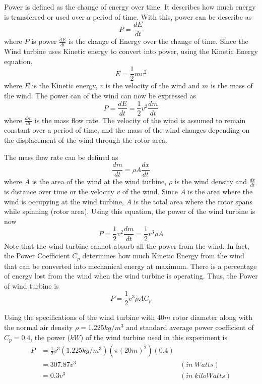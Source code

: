 
Power is defined as the change of energy over time. It describes how much energy is transferred or used over a period of time. With this, power can be describe as
\begin{equation}
    P = \frac{dE}{dt}
\end{equation}
where $P$ is power $\frac{dE}{dt}$ is the change of Energy over the change of time. Since the Wind turbine uses Kinetic energy to convert into power, using the Kinetic Energy equation,
\begin{equation}
    E = \frac{1}{2}mv^{2}
\end{equation}
where $E$ is the Kinetic energy, $v$ is the velocity of the wind and $m$ is the mass of the wind. The power can of the wind can now be expressed as
\begin{equation}
    P = \frac{dE}{dt} = \frac{1}{2}v^{2}\frac{dm}{dt}
\end{equation}
where $\frac{dm}{dt}$ is the mass flow rate. The velocity of the wind is assumed to remain constant over a period of time, and the mass of the wind changes depending on the displacement of the wind through the rotor area.

The mass flow rate can be defined as
\begin{equation}
    \frac{dm}{dt} = \rho A\frac{dx}{dt}
\end{equation}
where $A$ is the area of the wind at the wind turbine, $\rho$ is the wind density and $\frac{dx}{dt}$ is distance over time or the velocity $v$ of the wind. Since $A$ is the area where the wind is occupying at the wind turbine, $A$ is the total area where the rotor spans while spinning (rotor area). Using this equation, the power of the wind turbine is now
\begin{equation}
    P = \frac{1}{2}v^{2}\frac{dm}{dt} = \frac{1}{2}v^{3}\rho A
\end{equation}
Note that the wind turbine cannot absorb all the power from the wind. In fact, the Power Coefficient $C_p$ determines how much Kinetic Energy from the wind that can be converted into mechanical energy at maximum. There is a percentage of energy lost from the wind when the wind turbine is operating. Thus, the Power of wind turbine is
\begin{equation}
    P =  \frac{1}{2}v^{3}\rho A C_{p}
\end{equation}

Using the specifications of the wind turbine with $40m$ rotor diameter along with the normal air density $\rho = 1.225kg/m^{3}$ and standard average power coefficient of $C_{p}=0.4$, the power ($kW$) of the wind turbine used in this experiment is 
\begin{align*}
    P &=  \frac{1}{2}v^{3}(1.225kg/m^3)(\pi (20m)^2)(0.4)\\
        &= 307.87v^{3} &(in \;Watts) \\
        &= 0.3v^3 &(in \;kiloWatts)
\end{align*}

